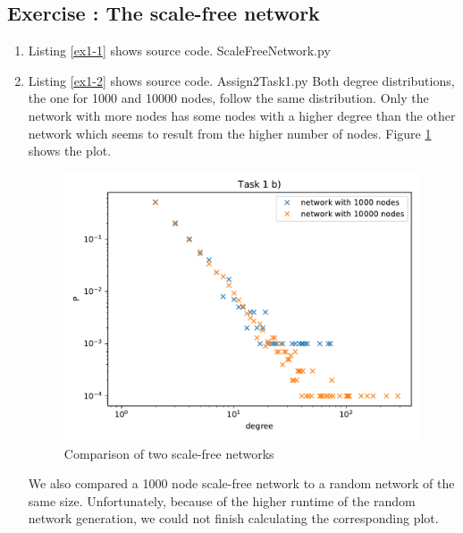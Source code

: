 \documentclass[10pt,a4paper]{article}
\newcommand{\exercise}[1]
{
  \stepcounter{subsection}
  \subsection*{Exercise \thesubsection: #1}

}
\begin{document}
\exercise{The scale-free network}
\begin{enumerate}
\item Listing \ref{ex1-1} shows source code.
 {ScaleFreeNetwork.py}

\item Listing \ref{ex1-2} shows source code.
 {Assign2Task1.py}
Both degree distributions, the one for 1000 and 10000 nodes, follow the same distribution. Only the network with more nodes has some nodes with a higher degree than the other network which seems to result from the higher number of nodes. Figure \ref{fig-1} shows the plot.\\
\begin{figure}
\includegraphics[scale=1]{Figure_1.pdf}
\caption{Comparison of two scale-free networks}
\label{fig-1}
\end{figure}
We also compared a 1000 node scale-free network to a random network of the same size. Unfortunately, because of the higher runtime of the random network generation, we could not finish calculating the corresponding plot.


\end{enumerate}
\end{document}
